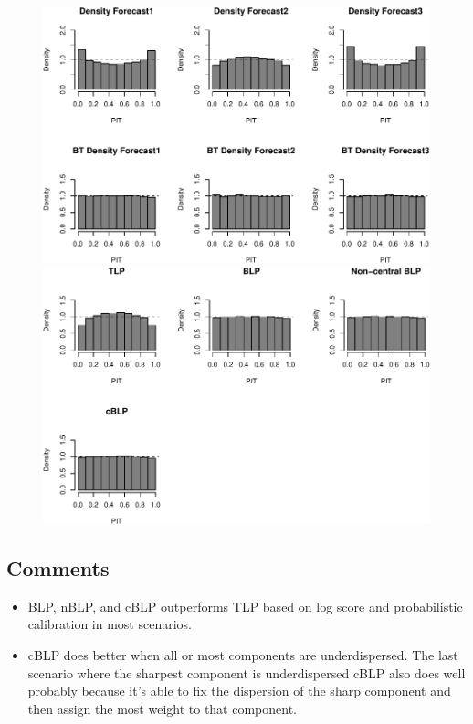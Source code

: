 \documentclass[]{article}
\providecommand{\tightlist}{%
  \setlength{\itemsep}{0pt}\setlength{\parskip}{0pt}}
\begin{document}
\clearpage

\begin{figure}[H]

{\centering \includegraphics{Newest_BLPsim_new_files/figure-latex/unnamed-chunk-16-1} \includegraphics{Newest_BLPsim_new_files/figure-latex/unnamed-chunk-16-2} 

}

\end{figure}

\hypertarget{comments}{%
\subsection{Comments}\label{comments}}

\begin{itemize}
\tightlist
\item
  BLP, nBLP, and cBLP outperforms TLP based on log score and
  probabilistic calibration in most scenarios.
\item
  cBLP does better when all or most components are underdispersed. The
  last scenario where the sharpest component is underdispersed cBLP also
  does well probably because it's able to fix the dispersion of the
  sharp component and then assign the most weight to that component.
\end{itemize}
\end{document}
